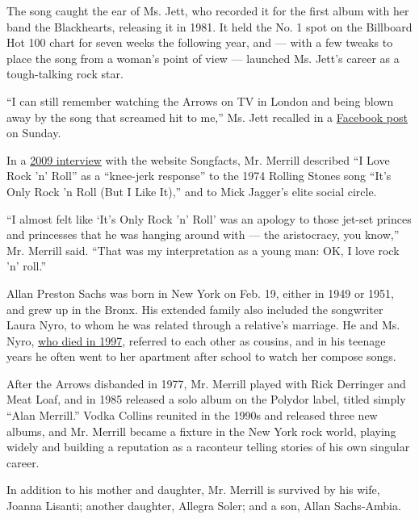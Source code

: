 The song caught the ear of Ms. Jett, who recorded it for the first album
with her band the Blackhearts, releasing it in 1981. It held the No. 1
spot on the Billboard Hot 100 chart for seven weeks the following year,
and --- with a few tweaks to place the song from a woman's point of view
--- launched Ms. Jett's career as a tough-talking rock star.

``I can still remember watching the Arrows on TV in London and being
blown away by the song that screamed hit to me,'' Ms. Jett recalled in a
\href{https://www.facebookcorewwwi.onion/joanjettandtheblackhearts/photos/a.129315806006/10157987982441007/?type=3\&theater}{Facebook
post} on Sunday.

In a
\href{https://www.songfacts.com/blog/interviews/alan-merrill-of-the-arrows}{2009
interview} with the website Songfacts, Mr. Merrill described ``I Love
Rock 'n' Roll'' as a ``knee-jerk response'' to the 1974 Rolling Stones
song ``It's Only Rock 'n Roll (But I Like It),'' and to Mick Jagger's
elite social circle.

``I almost felt like `It's Only Rock 'n' Roll' was an apology to those
jet-set princes and princesses that he was hanging around with --- the
aristocracy, you know,'' Mr. Merrill said. ``That was my interpretation
as a young man: OK, I love rock 'n' roll.''

Allan Preston Sachs was born in New York on Feb. 19, either in 1949 or
1951, and grew up in the Bronx. His extended family also included the
songwriter Laura Nyro, to whom he was related through a relative's
marriage. He and Ms. Nyro,
\href{https://www.nytimes3xbfgragh.onion/1997/04/10/arts/laura-nyro-intense-balladeer-of-60-s-and-70-s-dies-at-49.html}{who
died in 1997}, referred to each other as cousins, and in his teenage
years he often went to her apartment after school to watch her compose
songs.

After the Arrows disbanded in 1977, Mr. Merrill played with Rick
Derringer and Meat Loaf, and in 1985 released a solo album on the
Polydor label, titled simply ``Alan Merrill.'' Vodka Collins reunited in
the 1990s and released three new albums, and Mr. Merrill became a
fixture in the New York rock world, playing widely and building a
reputation as a raconteur telling stories of his own singular career.

In addition to his mother and daughter, Mr. Merrill is survived by his
wife, Joanna Lisanti; another daughter, Allegra Soler; and a son, Allan
Sachs-Ambia.

\href{https://www.nytimes3xbfgragh.onion/interactive/2020/obituaries/people-died-coronavirus-obituaries.html?action=click\&pgtype=Article\&state=default\&region=BELOW_MAIN_CONTENT\&context=covid_obits_promo}{}

